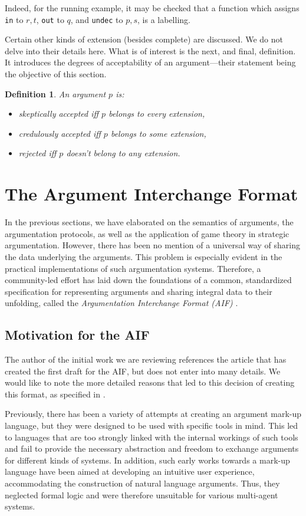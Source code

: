 \documentclass[12pt, a4paper]{article}
\newtheorem{Def}{Definition}[subsection]
\begin{document}
Indeed, for the running example, it may be checked that a function which assigns \texttt{in} to $r, t$, \texttt{out} to $q$, and \texttt{undec} to $p, s$, is a labelling.

Certain other kinds of extension (besides complete) are discussed. We do not delve into their details here. What is of interest is the next, and final, definition. It introduces the degrees of acceptability of an argument---their statement being the objective of this section.

\begin{Def}
An argument $p$ is:
\begin{itemize}
\item \emph{skeptically accepted} iff $p$ belongs to every extension,
\item \emph{credulously accepted} iff $p$ belongs to some extension,
\item \emph{rejected} iff $p$ doesn't belong to any extension.
\end{itemize}
\end{Def}


\section{The Argument Interchange Format}
In the previous sections, we have elaborated on the semantics of arguments, the argumentation protocols, as well as the application of game theory in strategic argumentation. However, there has been no mention of a universal way of sharing the data underlying the arguments. This problem is especially evident in the practical implementations of such argumentation systems. Therefore, a community-led effort has laid down the foundations of a common, standardized specification for representing arguments and sharing integral data to their unfolding, called the \emph{Argumentation Interchange Format (AIF)} \cite{aif}.

\subsection{Motivation for the AIF}
The author of the initial work we are reviewing references the article that has created the first draft for the AIF, but does not enter into many details. We would like to note the more detailed reasons that led to this decision of creating this format, as specified in \cite{aif}. 

Previously, there has been a variety of attempts at creating an argument mark-up language, but they were designed to be used with specific tools in mind. This led to languages that are too strongly linked with the internal workings of such tools and fail to provide the necessary abstraction and freedom to exchange arguments for different kinds of systems. In addition, such early works towards a mark-up language have been aimed at developing an intuitive user experience, accommodating the construction of natural language arguments. Thus, they neglected formal logic and were therefore unsuitable for various multi-agent systems.
\end{document}
